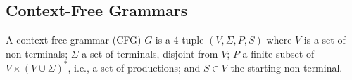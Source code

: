 \documentclass[runningheads]{llncs}
\newcommand{\support}{\mathit{Supp}}
\newcommand{\NT}{V} %
\newcommand{\T}{\Sigma} %
\newcommand{\regex}{\mathit{Reg}}
\begin{document}








\subsection{Context-Free Grammars} \label{sec:preliminaries-cfgs}

A context-free grammar (CFG) $G$ is a 4-tuple $(\NT, \T, P, S)$ where $\NT$ is a set of non-terminals; $\T$ a set of terminals, disjoint from $\NT$; $P$ a finite subset of $\NT \times (\NT \cup \T)^{*}$, i.e., a set of productions; and $S \in \NT$ the starting non-terminal.
\end{document}
